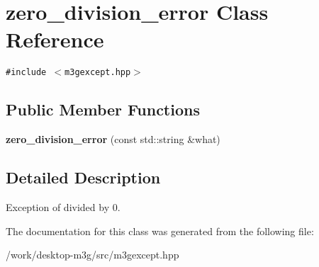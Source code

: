 \hypertarget{classm3g_1_1zero__division__error}{
\section{zero\_\-division\_\-error Class Reference}
\label{classm3g_1_1zero__division__error}
}
{\tt \#include $<$m3gexcept.hpp$>$}

\subsection*{Public Member Functions}
\begin{CompactItemize}
\item 
\hypertarget{classm3g_1_1zero__division__error_b5d399df97c6b33de2f21b7eecfd4d53}{
\textbf{zero\_\-division\_\-error} (const std::string \&what)}
\label{classm3g_1_1zero__division__error_b5d399df97c6b33de2f21b7eecfd4d53}

\end{CompactItemize}


\subsection{Detailed Description}
Exception of divided by 0. 

The documentation for this class was generated from the following file:\begin{CompactItemize}
\item 
/work/desktop-m3g/src/m3gexcept.hpp\end{CompactItemize}

